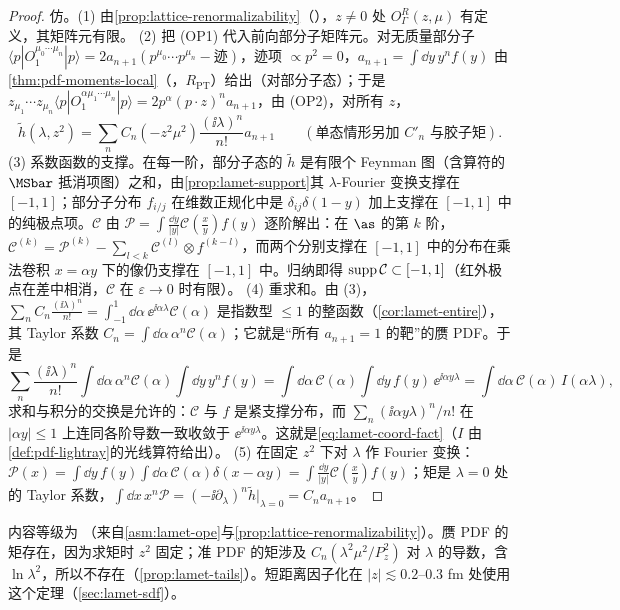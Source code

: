 \begin{proof}
仿\cite[第~II--III~节]{IzubuchiEtAl2018}。(1) 由\cref{prop:lattice-renormalizability}（\tagA），$z\neq0$ 处 $O^R_\Gamma(z,\mu)$ 有定义，其矩阵元有限。
(2) 把 (OP1) 代入前向部分子矩阵元。对无质量部分子 $\langle p|O_1^{\mu_0\cdots\mu_n}|p\rangle=2a_{n+1}(p^{\mu_0}\cdots p^{\mu_n}-\text{迹})$，迹项 $\propto p^2=0$，$a_{n+1}=\int\dd y\,y^nf(y)$ 由\cref{thm:pdf-moments-local}（\tagR，$R_{\mathrm{PT}}$）给出（对部分子态）；于是 $z_{\mu_1}\cdots z_{\mu_n}\langle p|O_1^{\alpha\mu_1\cdots\mu_n}|p\rangle=2p^\alpha(p\cdot z)^na_{n+1}$，由 (OP2)，对所有 $z$，
\[
\tilde h(\lambda,z^2)=\sum_nC_n(-z^2\mu^2)\frac{(\ii\lambda)^n}{n!}a_{n+1}\qquad(\text{单态情形另加 }C'_n\text{ 与胶子矩}).
\]
(3) 系数函数的支撑。在每一阶，部分子态的 $\tilde h$ 是有限个 Feynman 图（含算符的 $\MSbar$ 抵消项图）之和，由\cref{prop:lamet-support}其 $\lambda$-Fourier 变换支撑在 $[-1,1]$；部分子分布 $f_{i/j}$ 在维数正规化中是 $\delta_{ij}\delta(1-y)$ 加上支撑在 $[-1,1]$ 中的纯极点项。$\mathcal C$ 由 $\mathcal P=\int\frac{\dd y}{|y|}\mathcal C(\frac xy)f(y)$ 逐阶解出：在 $\as$ 的第 $k$ 阶，$\mathcal C^{(k)}=\mathcal P^{(k)}-\sum_{l<k}\mathcal C^{(l)}\otimes f^{(k-l)}$，而两个分别支撑在 $[-1,1]$ 中的分布在乘法卷积 $x=\alpha y$ 下的像仍支撑在 $[-1,1]$ 中。归纳即得 ${\rm supp}\,\mathcal C\subset[-1,1]$（红外极点在差中相消，$\mathcal C$ 在 $\varepsilon\to0$ 时有限）。
(4) 重求和。由 (3)，$\sum_nC_n\frac{(\ii\lambda)^n}{n!}=\int_{-1}^1\dd\alpha\,\ee^{\ii\alpha\lambda}\mathcal C(\alpha)$ 是指数型 $\le1$ 的整函数（\cref{cor:lamet-entire}），其 Taylor 系数 $C_n=\int\dd\alpha\,\alpha^n\mathcal C(\alpha)$；它就是“所有 $a_{n+1}=1$ 的靶”的赝 PDF。于是
\[
\sum_n\frac{(\ii\lambda)^n}{n!}\int\dd\alpha\,\alpha^n\mathcal C(\alpha)\int\dd y\,y^nf(y)=\int\dd\alpha\,\mathcal C(\alpha)\int\dd y\,f(y)\,\ee^{\ii\alpha y\lambda}=\int\dd\alpha\,\mathcal C(\alpha)\,I(\alpha\lambda),
\]
求和与积分的交换是允许的：$\mathcal C$ 与 $f$ 是紧支撑分布，而 $\sum_n(\ii\alpha y\lambda)^n/n!$ 在 $|\alpha y|\le1$ 上连同各阶导数一致收敛于 $\ee^{\ii\alpha y\lambda}$。这就是\cref{eq:lamet-coord-fact}（$I$ 由\cref{def:pdf-lightray}的光线算符给出）。
(5) 在固定 $z^2$ 下对 $\lambda$ 作 Fourier 变换：$\mathcal P(x)=\int\dd y\,f(y)\int\dd\alpha\,\mathcal C(\alpha)\delta(x-\alpha y)=\int\frac{\dd y}{|y|}\mathcal C(\frac xy)f(y)$；矩是 $\lambda=0$ 处的 Taylor 系数，$\int\dd x\,x^n\mathcal P=(-\ii\partial_\lambda)^n\tilde h|_{\lambda=0}=C_na_{n+1}$。
\end{proof}

内容等级为 \tagA（来自\cref{asm:lamet-ope}与\cref{prop:lattice-renormalizability}）。赝 PDF 的矩存在，因为求矩时 $z^2$ 固定；准 PDF 的矩涉及 $C_n(\lambda^2\mu^2/P_z^2)$ 对 $\lambda$ 的导数，含 $\ln\lambda^2$，所以不存在（\cref{prop:lamet-tails}）。短距离因子化在 $|z|\lesssim0.2$--$0.3$ fm 处使用这个定理（\cref{sec:lamet-sdf}）。

